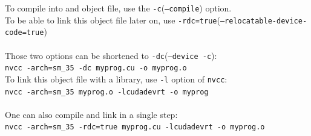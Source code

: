 \documentclass[fleqn,11pt,aspectratio=43]{beamer}
\begin{document}
\begin{frame}
	To compile into and object file, use the \texttt{-c}(\texttt{--compile}) option.\\
	To be able to link this object file later on, use \texttt{-rdc=true}(\texttt{--relocatable-device-code=true})\\
	\\
	Those two options can be shortened to \texttt{-dc}(\texttt{--device -c}):\\
	\texttt{nvcc -arch=sm\_35 -dc myprog.cu -o myprog.o}\\
	To link this object file with a library, use \texttt{-l} option of \texttt{nvcc}:\\
	\texttt{nvcc -arch=sm\_35 myprog.o -lcudadevrt -o myprog}\\
	\\
	One can also compile and link in a single step:\\
	\texttt{nvcc -arch=sm\_35 -rdc=true myprog.cu -lcudadevrt -o myprog.o}
\end{frame}
\end{document}
